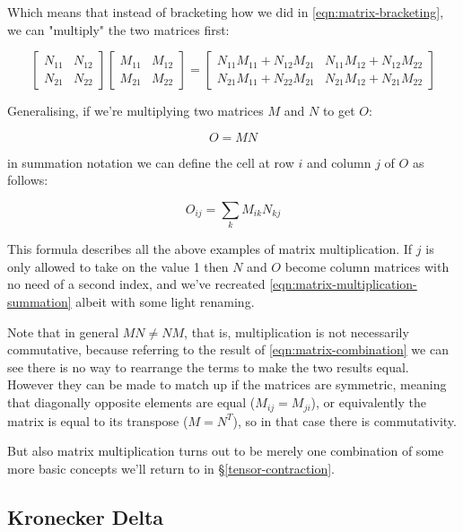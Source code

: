 Which means that instead of bracketing how we did in \eqref{eqn:matrix-bracketing}, we can "multiply" the two matrices first:

\begin{equation}
\begin{bmatrix}
N_{11} & N_{12} \\
N_{21} & N_{22}
\end{bmatrix}
\begin{bmatrix}
M_{11} & M_{12} \\
M_{21} & M_{22}
\end{bmatrix}
=
\begin{bmatrix}
N_{11}M_{11} + N_{12}M_{21} & N_{11}M_{12} + N_{12}M_{22} \\
N_{21}M_{11} + N_{22}M_{21} & N_{21}M_{12} + N_{21}M_{22}
\end{bmatrix}
\label{eqn:matrix-combination}
\end{equation}

Generalising, if we're multiplying two matrices $M$ and $N$ to get $O$:

$$O = MN$$

in summation notation we can define the cell at row $i$ and column $j$ of $O$ as follows:

$$O_{ij} = \sum_k M_{ik} N_{kj}$$

This formula describes all the above examples of matrix multiplication. If $j$ is only allowed to take on the value 1 then $N$ and $O$ become column matrices with no need of a second index, and we've recreated \eqref{eqn:matrix-multiplication-summation} albeit with some light renaming.

Note that in general $MN \ne NM$, that is, multiplication is not necessarily commutative, because referring to the result of \eqref{eqn:matrix-combination} we can see there is no way to rearrange the terms to make the two results equal. However they can be made to match up if the matrices are symmetric, meaning that diagonally opposite elements are equal ($M_{ij} = M_{ji}$), or equivalently the matrix is equal to its transpose ($M = N^T$), so in that case there is commutativity.

But also matrix multiplication turns out to be merely one combination of some more basic concepts we'll return to in §\ref{tensor-contraction}.

\subsection{Kronecker Delta} \label{def:Kronecker}

